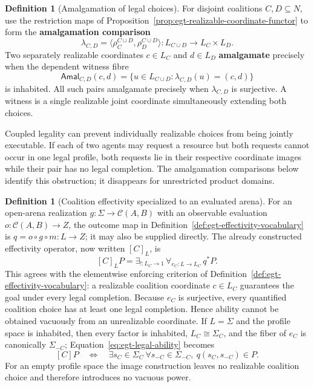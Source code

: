 \documentclass[11pt,a4paper]{article}
\numberwithin{equation}{section}
\theoremstyle{definition}
\newtheorem{definition}[theorem]{Definition}
\theoremstyle{remark}
\theoremstyle{plain}
\begin{document}
\begin{definition}[Amalgamation of legal choices]
\label{def:egt-legal-amalgamation}
For disjoint coalitions $C,D\subseteq N$, use the restriction maps of
Proposition~\ref{prop:egt-realizable-coordinate-functor} to form the
\textbf{amalgamation comparison}
\[
 \lambda_{C,D}=
 \langle\rho_C^{C\cup D},\rho_D^{C\cup D}\rangle:
 L_{C\cup D}\longrightarrow L_C\times L_D.
\]
Two separately realizable coordinates $c\in L_C$ and $d\in L_D$
\textbf{amalgamate} precisely when the dependent witness fibre
\[
 \mathsf{Amal}_{C,D}(c,d)
 =\{u\in L_{C\cup D}:\lambda_{C,D}(u)=(c,d)\}
\]
is inhabited. All such pairs amalgamate precisely when
$\lambda_{C,D}$ is surjective. A witness is a single realizable joint
coordinate simultaneously extending both choices.
\end{definition}
Coupled legality can prevent individually realizable choices from
being jointly executable. If each of two agents may request a resource but
both requests cannot occur in one legal profile, both requests lie in
their respective coordinate images while their pair has no legal
completion. The amalgamation comparisons below identify this obstruction;
it disappears for unrestricted product domains.

\begin{definition}[Coalition effectivity specialized to an evaluated arena]
\label{def:egt-coalition-effectivity-on-a-legal-domain}
For an open-arena realization $g:\Sigma\to\mathcal C(A,B)$ with an
observable evaluation $o:\mathcal C(A,B)\to Z$, the outcome map in
Definition~\ref{def:egt-effectivity-vocabulary} is
$q=o\circ g\circ m:L\to Z$; it may also be supplied directly.
The already constructed effectivity operator, now written $[C]_L$, is
\begin{equation}
\label{eq:egt-legal-ability}
 [C]_L P
 =\exists_{!:L_C\to1}\,\forall_{e_C:L\to L_C}\,q^*P.
\end{equation}
This agrees with the elementwise enforcing criterion of
Definition~\ref{def:egt-effectivity-vocabulary}: a realizable coalition
coordinate $c\in L_C$ guarantees the goal under every legal completion.
Because $e_C$ is surjective, every quantified coalition choice has at least
one legal completion. Hence ability cannot be obtained vacuously from an
unrealizable coordinate. If $L=\Sigma$ and the profile space is inhabited,
then every factor is inhabited, $L_C\cong\Sigma_C$, and the fiber of $e_C$ is
canonically $\Sigma_{-C}$; Equation~\eqref{eq:egt-legal-ability} becomes
\begin{equation}
\label{eq:egt-ability}
 [C]P\quad\Longleftrightarrow\quad
 \exists s_C\in\Sigma_C\ \forall s_{-C}\in\Sigma_{-C},
       \ q(s_C,s_{-C})\in P.
\end{equation}
For an empty profile space the image construction leaves no realizable
coalition choice and therefore introduces no vacuous power.
\end{definition}
\end{document}
